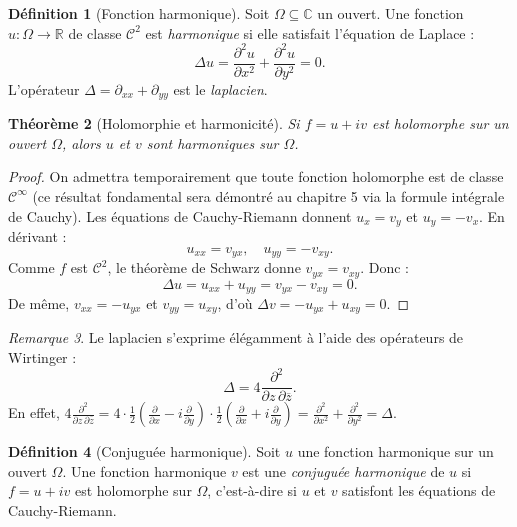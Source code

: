 \documentclass[12pt,a4paper,openany]{book}
\theoremstyle{definition}
\newtheorem{definition}{Définition}[chapter]
\theoremstyle{plain}
\newtheorem{theoreme}[definition]{Théorème}
\theoremstyle{remark}
\newtheorem{remarque}[definition]{Remarque}
\newcommand{\C}{\mathbb{C}}
\newcommand{\R}{\mathbb{R}}
\newcommand{\conj}[1]{\overline{#1}}
\begin{document}
\begin{definition}[Fonction harmonique]\label{def:harmonique}
Soit $\Omega \subseteq \C$ un ouvert. Une fonction $u : \Omega \to \R$ de classe $\mathscr{C}^2$ est \emph{harmonique} si elle satisfait l'équation de Laplace :
\[
  \Delta u = \frac{\partial^2 u}{\partial x^2} + \frac{\partial^2 u}{\partial y^2} = 0.
\]
L'opérateur $\Delta = \partial_{xx} + \partial_{yy}$ est le \emph{laplacien}.
\end{definition}

\begin{theoreme}[Holomorphie et harmonicité]\label{thm:holomorphe-harmonique}
Si $f = u + iv$ est holomorphe sur un ouvert $\Omega$, alors $u$ et $v$ sont harmoniques sur $\Omega$.
\end{theoreme}

\begin{proof}
On admettra temporairement que toute fonction holomorphe est de classe $\mathscr{C}^\infty$ (ce résultat fondamental sera démontré au chapitre 5 via la formule intégrale de Cauchy). Les équations de Cauchy-Riemann donnent $u_x = v_y$ et $u_y = -v_x$. En dérivant :
\[
  u_{xx} = v_{yx}, \quad u_{yy} = -v_{xy}.
\]
Comme $f$ est $\mathscr{C}^2$, le théorème de Schwarz donne $v_{yx} = v_{xy}$. Donc :
\[
  \Delta u = u_{xx} + u_{yy} = v_{yx} - v_{xy} = 0.
\]
De même, $v_{xx} = -u_{yx}$ et $v_{yy} = u_{xy}$, d'où $\Delta v = -u_{yx} + u_{xy} = 0$.
\end{proof}

\begin{remarque}\label{rem:laplacien-wirtinger}
Le laplacien s'exprime élégamment à l'aide des opérateurs de Wirtinger :
\[
  \Delta = 4\frac{\partial^2}{\partial z\,\partial\conj{z}}.
\]
En effet, $4\frac{\partial^2}{\partial z\,\partial\conj{z}} = 4\cdot\frac{1}{2}\left(\frac{\partial}{\partial x}-i\frac{\partial}{\partial y}\right)\cdot\frac{1}{2}\left(\frac{\partial}{\partial x}+i\frac{\partial}{\partial y}\right) = \frac{\partial^2}{\partial x^2}+\frac{\partial^2}{\partial y^2} = \Delta$.
\end{remarque}

\begin{definition}[Conjuguée harmonique]\label{def:conjuguee-harmonique}
Soit $u$ une fonction harmonique sur un ouvert $\Omega$. Une fonction harmonique $v$ est une \emph{conjuguée harmonique} de $u$ si $f = u + iv$ est holomorphe sur $\Omega$, c'est-à-dire si $u$ et $v$ satisfont les équations de Cauchy-Riemann.
\end{definition}
\end{document}
